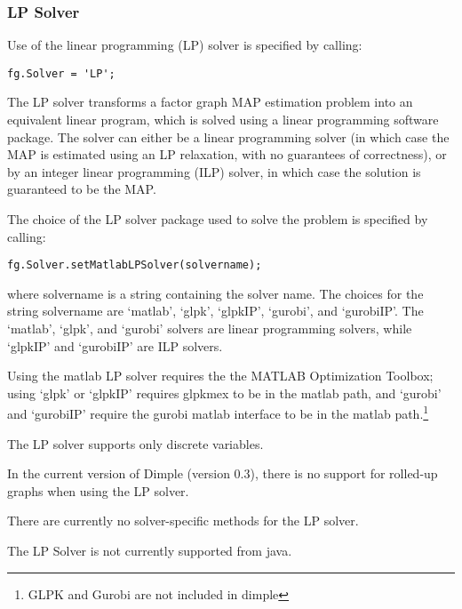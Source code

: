 \subsubsection{LP Solver}
\label{sec:LPSolver}

\ifmatlab
Use of the linear programming (LP) solver is specified by calling:

\begin{lstlisting}
fg.Solver = 'LP';
\end{lstlisting}

The LP solver transforms a factor graph MAP estimation problem into an equivalent linear program, which is solved using a linear programming software package. The solver can either be a linear programming solver (in which case the MAP is estimated using an LP relaxation, with no guarantees of correctness), or by an integer linear programming (ILP) solver, in which case the solution is guaranteed to be the MAP. 

The choice of the LP solver package used to solve the problem is specified by calling:
\begin{lstlisting}
fg.Solver.setMatlabLPSolver(solvername);
\end{lstlisting}
where solvername is a string containing the solver name. The choices for the string solvername are `matlab', `glpk', `glpkIP', `gurobi', and `gurobiIP'. The `matlab', `glpk', and `gurobi' solvers are linear programming solvers, while `glpkIP' and `gurobiIP' are ILP solvers.

Using the matlab LP solver requires the the MATLAB Optimization Toolbox; using `glpk' or `glpkIP' requires glpkmex to be in the matlab path, and `gurobi' and `gurobiIP' require the gurobi matlab interface to be in the matlab path.\footnote{GLPK and Gurobi are not included in dimple}

The LP solver supports only discrete variables.

In the current version of Dimple (version 0.3), there is no support for rolled-up graphs when using the LP solver.

There are currently no solver-specific methods for the LP solver.

\fi

\ifjava
The LP Solver is not currently supported from java.
\fi
